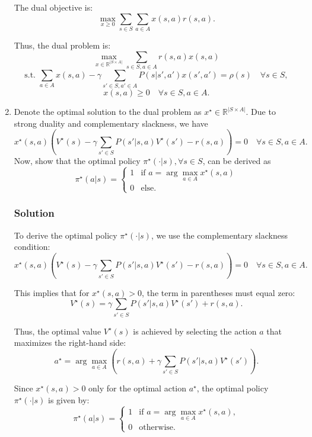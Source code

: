 \documentclass{article}
\begin{document}
\begin{enumerate}[label=(\alph*)]
    The dual objective is:
    \[
    \max_{x \geq 0} \sum_{s \in S} \sum_{a \in A} x(s, a)r(s, a).
    \]

    Thus, the dual problem is:
    \[
    \max_{x \in \mathbb{R}^{|S \times A|}} \sum_{s \in S, a \in A} r(s, a)x(s, a)
    \]
    \[
    \text{s.t. } \sum_{a \in A} x(s, a) - \gamma \sum_{s' \in S, a' \in A} P(s|s', a')x(s', a') = \rho(s) \quad \forall s \in S,
    \]
    \[
    x(s, a) \geq 0 \quad \forall s \in S, a \in A.
    \]

    \item Denote the optimal solution to the dual problem as \( x^\star \in \mathbb{R}^{|S \times A|} \). Due to strong duality and complementary slackness, we have
    \[
    x^\star(s, a) \left( V^\star(s) - \gamma \sum_{s' \in S} P(s'|s, a)V^\star(s') - r(s, a) \right) = 0 \quad \forall s \in S, a \in A.
    \]
    Now, show that the optimal policy \( \pi^\star(\cdot|s), \forall s \in S \), can be derived as
    \[
    \pi^\star(a|s) =
    \begin{cases}
    1 & \text{if } a = \arg \max_{a \in A} x^\star(s, a) \\
    0 & \text{else.}
    \end{cases}
    \]

    \subsubsection*{Solution}
    To derive the optimal policy \( \pi^\star(\cdot|s) \), we use the complementary slackness condition:
    \[
    x^\star(s, a) \left( V^\star(s) - \gamma \sum_{s' \in S} P(s'|s, a)V^\star(s') - r(s, a) \right) = 0 \quad \forall s \in S, a \in A.
    \]

    This implies that for \( x^\star(s, a) > 0 \), the term in parentheses must equal zero:
    \[
    V^\star(s) = \gamma \sum_{s' \in S} P(s'|s, a)V^\star(s') + r(s, a).
    \]

    Thus, the optimal value \( V^\star(s) \) is achieved by selecting the action \( a \) that maximizes the right-hand side:
    \[
    a^\star = \arg \max_{a \in A} \left( r(s, a) + \gamma \sum_{s' \in S} P(s'|s, a)V^\star(s') \right).
    \]

    Since \( x^\star(s, a) > 0 \) only for the optimal action \( a^\star \), the optimal policy \( \pi^\star(\cdot|s) \) is given by:
    \[
    \pi^\star(a|s) =
    \begin{cases}
    1 & \text{if } a = \arg \max_{a \in A} x^\star(s, a), \\
    0 & \text{otherwise.}
    \end{cases}
    \]
\end{enumerate}
\end{document}
